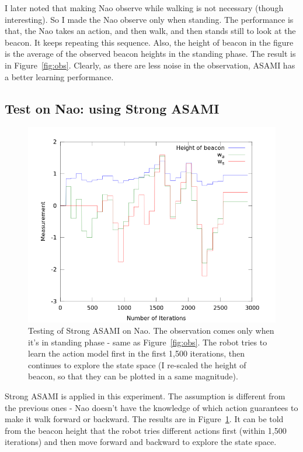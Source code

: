 \documentclass[10pt]{IEEEtran}
\begin{document}
I later noted that making Nao observe while walking is not necessary
(though interesting). So I made the Nao observe only when standing.
The performance is that, the Nao takes an action, and then walk, and
then stands still to look at the beacon. It keeps repeating this
sequence.  Also, the height of beacon in the figure is the average of
the observed beacon heights in the standing phase. The result is in
Figure~\ref{fig:obs}. Clearly, as there are less noise in the
observation, ASAMI has a better learning performance.

\subsection{Test on Nao: using Strong ASAMI}

\begin{figure}
\centering
\includegraphics[width=\columnwidth]{out_strong.png}
\caption{Testing of Strong ASAMI on Nao. The observation comes only
when it's in standing phase - same as Figure~\ref{fig:obs}. The robot
tries to learn the action model first in the first 1,500 iterations,
then continues to explore the state space (I re-scaled the height of
beacon, so that they can be plotted in a same magnitude).}
\label{fig:obs_strong}
\end{figure}

Strong ASAMI is applied in this experiment. The assumption is
different from the previous ones - Nao doesn't have the knowledge of
which action guarantees to make it walk forward or backward. The
results are in Figure~\ref{fig:obs_strong}. It can be told from the
beacon height that the robot tries different actions first (within
1,500 iterations) and then move forward and backward to explore the
state space.
\end{document}
